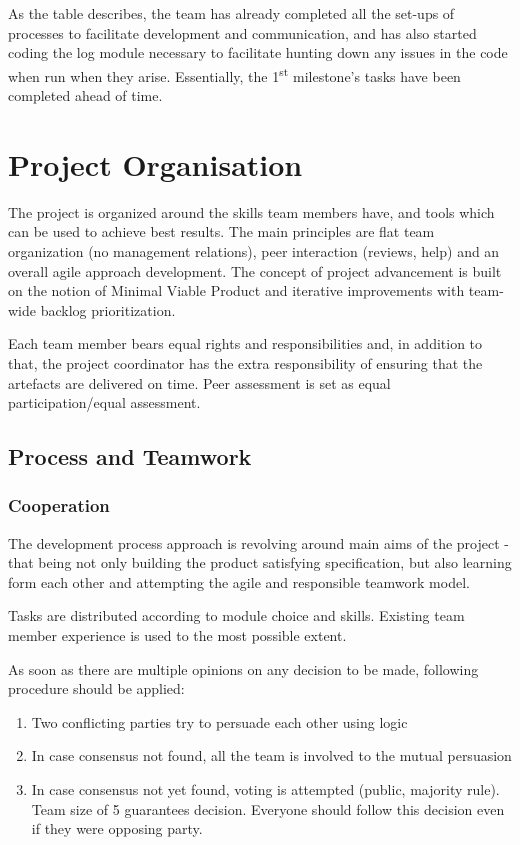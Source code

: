 As the table describes, the team has already completed all the set-ups of processes to facilitate development and communication, and has also started coding the log module necessary to facilitate hunting down any issues in the code when run when they arise. Essentially, the 1\textsuperscript{st} milestone's tasks have been completed ahead of time.

\section{Project Organisation} %
The project is organized around the skills team members have, and tools which can be used to achieve best results. The main
principles are flat team organization (no management relations), peer interaction (reviews, help) and an overall agile
approach development. The concept of project advancement is built on the notion of Minimal Viable Product and
iterative improvements with team-wide backlog prioritization.

Each team member bears equal rights and responsibilities and, in addition to that, the project coordinator has the extra responsibility
of ensuring that the artefacts are delivered on time. Peer assessment is set as equal participation/equal assessment.

\subsection{Process and Teamwork}
\subsubsection{Cooperation}
The development process approach is revolving around main aims of the project - that being not only building the product
satisfying specification, but also learning form each other and attempting the agile and responsible teamwork model.

Tasks are distributed according to module choice and skills. Existing team member experience is used to the most
possible extent.

As soon as there are multiple opinions on any decision to be made, following procedure should be applied:

\begin{enumerate}
    \item Two conflicting parties try to persuade each other using logic
    \item In case consensus not found, all the team is involved to the mutual persuasion
    \item In case consensus not yet found, voting is attempted (public, majority rule). Team size of 5 guarantees decision.
        Everyone should follow this decision even if they were opposing party.
\end{enumerate}

